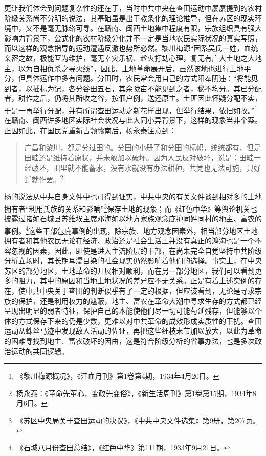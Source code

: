 更让我们体会到问题复杂性的还在于，当时中共中央在查田运动中屡屡提到的农村阶级关系尚不分明的说法，其基础虽是出于教条化的理论推导，但在苏区的现实环境中，又不是毫无脉络可寻。在赣南、闽西土地集中程度有限，宗族组织具有强大影响力背景下，公式化的农村阶级分化并不一定是当地农民实际状况的真实写照，而以这样的观念指导的运动遭遇反激也势所必然。黎川梅源“因系吴氏一姓，血统亲密之故，极能互为维护，毫无幸灾乐祸、趁火打劫心理，复无有广大土地之大地主，以为自相仇杀之导火线”，因此，土地革命展开后，虽然该地也进行土地平分，但具体运作中多有问题。分田时，农民常会用自己的方式阳奉阴违：“将能见到者，以插标为记，各分谷田五石，其余陇亩不能见到之者，秘不均分。其已分配者，耕作之后，仍将其所收之谷，按佃户例，送还原主。土匪因此怀疑分配不实，于是一再举行分配，并有所谓查田运动之新花样出现，但举行结果，依旧如故。”\footnote{《黎川梅源概况》，《汗血月刊》第1卷第4期，1934年4月20日。}在赣南、闽西许多地区实际社会状况与此大同小异背景下，这样的现象当非个案。正因如此，在国民党重新占领赣南后，杨永泰注意到：

\begin{quote}

广昌和黎川，都是分过田的。分田的小册子和分田的标帜，统统都有，但是田畦还是维持着原状，并未敢加以破坏。因为人民反对破坏，说是：田畦一经破坏，田里就不能蓄水，没有水就没有办法耕种，共党也无法可施，只好迁就作罢。\footnote{杨永泰：《革命先革心，变政先变俗》，《新生活周刊》第1卷第15期，1934年8月6日。}
\end{quote}


杨的说法从中共自身文件中也可得到证实，中共中央的有关文件谈到相对多的土地拥有者“利用氏族的关系和影响”\footnote{《苏区中央局关于查田运动的决议》，《中共中央文件选集》第9册，第207页。}保存土地的现象；而《红色中华》等舆论机关也披露过诸如石城县苏维埃主席邓海如以地方家族观念庇护同姓同村的地主、富农的事例。\footnote{《石城八月份查田总结》，《红色中华》第111期，1933年9月21日。}这些干部包庇事例的出现，除宗族、地方观念因素外，相当部分地区土地拥有者和其他农民无论在经济、政治还是社会生活上并没有真正的鸿沟也是一个不容忽视的因素，因此，即使是进入主流阶层的干部，在尚未完全自觉坚持中共阶级分析立场时，其长期耳濡目染的社会现实仍然影响着他们的选择。事实上，在中央苏区的部分地区，土地革命的开展相对顺利，而在另一部分地区，我们可以看到更多的阻力，其中的原因和当地土地状况的差异应不无关系。正是有着上述实例的存在，使中共中央关于查田的判断似乎有了一定的根据，但应该看到，无论是寻求宗族的保护，还是利用权力的遮蔽，地主、富农在革命大潮中寻求生存的方式都已经呈现出明显的弱者特征，保护自己的本能使他们尽一切可能苟延残存，但能够以个体的方式保存下来的仍是少数，更难以对中共革命的成效形成实质性的干扰。查田运动从蛛丝马迹中发现敌人活动的佐证，再把这些细枝末节加以放大，以此为革命的困难寻找到地主、富农破坏的因由，这是符合阶级分析的省事办法，也是多次政治运动的共同逻辑。


